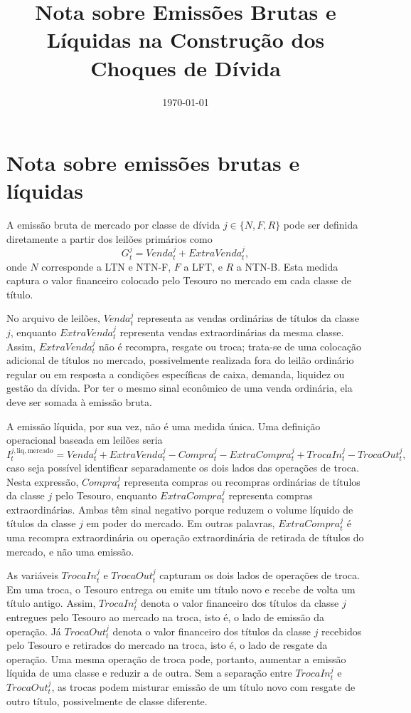 \documentclass[11pt,a4paper]{article}
\title{Nota sobre Emiss\~oes Brutas e L\'iquidas na Constru\c{c}\~ao dos Choques de D\'ivida}
\author{}
\date{\today}
\begin{document}
\maketitle

\section*{Nota sobre emiss\~oes brutas e l\'iquidas}

A emiss\~ao bruta de mercado por classe de d\'ivida \(j\in\{N,F,R\}\) pode ser definida diretamente a partir dos leil\~oes prim\'arios como
\[
G_t^j
=
Venda_t^j
+
ExtraVenda_t^j,
\]
onde \(N\) corresponde a LTN e NTN-F, \(F\) a LFT, e \(R\) a NTN-B. Esta medida captura o valor financeiro colocado pelo Tesouro no mercado em cada classe de t\'itulo.

No arquivo de leil\~oes, \(Venda_t^j\) representa as vendas ordin\'arias de t\'itulos da classe \(j\), enquanto \(ExtraVenda_t^j\) representa vendas extraordin\'arias da mesma classe. Assim, \(ExtraVenda_t^j\) n\~ao \'e recompra, resgate ou troca; trata-se de uma coloca\c{c}\~ao adicional de t\'itulos no mercado, possivelmente realizada fora do leil\~ao ordin\'ario regular ou em resposta a condi\c{c}\~oes espec\'ificas de caixa, demanda, liquidez ou gest\~ao da d\'ivida. Por ter o mesmo sinal econ\^omico de uma venda ordin\'aria, ela deve ser somada \`a emiss\~ao bruta.

A emiss\~ao l\'iquida, por sua vez, n\~ao \'e uma medida única. Uma defini\c{c}\~ao operacional baseada em leil\~oes seria
\[
I_t^{j,\mathrm{liq,mercado}}
=
Venda_t^j
+
ExtraVenda_t^j
-
Compra_t^j
-
ExtraCompra_t^j
+
TrocaIn_t^j
-
TrocaOut_t^j,
\]
caso seja poss\'ivel identificar separadamente os dois lados das opera\c{c}\~oes de troca. Nesta express\~ao, \(Compra_t^j\) representa compras ou recompras ordin\'arias de t\'itulos da classe \(j\) pelo Tesouro, enquanto \(ExtraCompra_t^j\) representa compras extraordin\'arias. Ambas t\^em sinal negativo porque reduzem o volume l\'iquido de t\'itulos da classe \(j\) em poder do mercado. Em outras palavras, \(ExtraCompra_t^j\) \'e uma recompra extraordin\'aria ou opera\c{c}\~ao extraordin\'aria de retirada de t\'itulos do mercado, e n\~ao uma emiss\~ao.

As vari\'aveis \(TrocaIn_t^j\) e \(TrocaOut_t^j\) capturam os dois lados de opera\c{c}\~oes de troca. Em uma troca, o Tesouro entrega ou emite um t\'itulo novo e recebe de volta um t\'itulo antigo. Assim, \(TrocaIn_t^j\) denota o valor financeiro dos t\'itulos da classe \(j\) entregues pelo Tesouro ao mercado na troca, isto \'e, o lado de emiss\~ao da opera\c{c}\~ao. J\'a \(TrocaOut_t^j\) denota o valor financeiro dos t\'itulos da classe \(j\) recebidos pelo Tesouro e retirados do mercado na troca, isto \'e, o lado de resgate da opera\c{c}\~ao. Uma mesma opera\c{c}\~ao de troca pode, portanto, aumentar a emiss\~ao l\'iquida de uma classe e reduzir a de outra. Sem a separa\c{c}\~ao entre \(TrocaIn_t^j\) e \(TrocaOut_t^j\), as trocas podem misturar emiss\~ao de um t\'itulo novo com resgate de outro t\'itulo, possivelmente de classe diferente.
\end{document}
